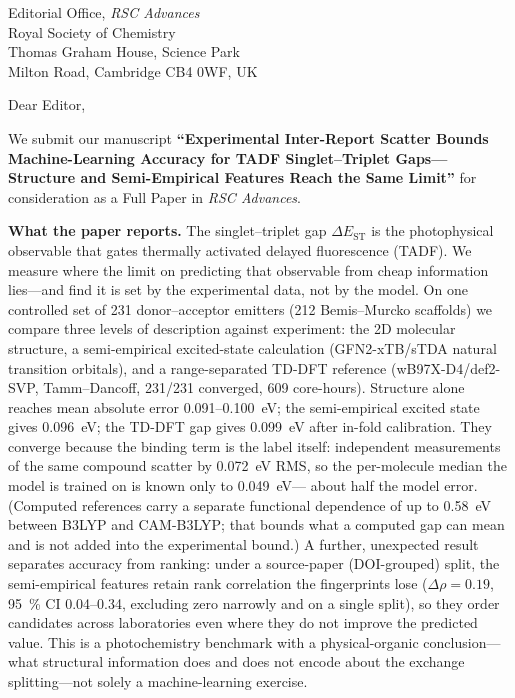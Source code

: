\documentclass[12pt,a4paper]{letter}
\date{September 13, 2026}
\begin{document}
\begin{letter}{
  Editorial Office, \textit{RSC Advances}\\
  Royal Society of Chemistry\\
  Thomas Graham House, Science Park\\
  Milton Road, Cambridge CB4 0WF, UK
}

\opening{Dear Editor,}

We submit our manuscript \textbf{``Experimental Inter-Report Scatter Bounds
Machine-Learning Accuracy for TADF Singlet--Triplet Gaps---Structure and
Semi-Empirical Features Reach the Same Limit''} for consideration as a Full Paper in
\textit{RSC Advances}.

\textbf{What the paper reports.}
The singlet--triplet gap $\Delta E_\text{ST}$ is the photophysical observable that
gates thermally activated delayed fluorescence (TADF). We measure where the
limit on predicting that observable from cheap information lies---and find it is
set by the experimental data, not by the model. On one controlled set of
\num{231} donor--acceptor emitters (\num{212} Bemis--Murcko scaffolds) we compare
three levels of description against experiment: the 2D molecular structure, a
semi-empirical excited-state calculation (GFN2-xTB/sTDA natural transition
orbitals), and a range-separated TD-DFT reference (wB97X-D4/def2-SVP,
Tamm--Dancoff, \num{231}/\num{231} converged, \num{609} core-hours). Structure
alone reaches mean absolute error \num{0.091}--\num{0.100}~eV; the semi-empirical
excited state gives \num{0.096}~eV; the TD-DFT gap gives \num{0.099}~eV after
in-fold calibration. They converge because the binding term is the label itself:
independent measurements of the same compound scatter by \num{0.072}~eV RMS, so
the per-molecule median the model is trained on is known only to \num{0.049}~eV---
about half the model error. (Computed references carry a separate functional
dependence of up to \num{0.58}~eV between B3LYP and CAM-B3LYP; that bounds what a
computed gap can mean and is not added into the experimental bound.) A further,
unexpected result separates accuracy from ranking: under a source-paper
(DOI-grouped) split, the semi-empirical features retain rank correlation the
fingerprints lose ($\Delta\rho = \num{0.19}$, \qty{95}{\percent} CI \numrange{0.04}{0.34},
excluding zero narrowly and on a single split), so they order candidates across
laboratories even where they do not improve the predicted value. This is a photochemistry benchmark with a
physical-organic conclusion---what structural information does and does not encode
about the exchange splitting---not solely a machine-learning exercise.


\end{letter}
\end{document}
